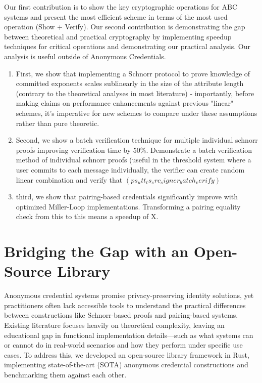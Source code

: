 Our first contribution is to show the key cryptographic operations for ABC systems and present the most efficient scheme in terms of the most used operation (Show + Verify). 
Our second contribution is demonstrating the gap between theoretical and practical cryptography by implementing speedup techniques for critical operations and demonstrating our practical analysis. Our analysis is useful outside of Anonymous Credentials.
\begin{enumerate}
    \item First, we show that implementing a Schnorr protocol to prove knowledge of committed exponents scales sublinearly in the size of the attribute length (contrary to the theoretical analyses in most literature) - importantly, before making claims on performance enhancements against previous "linear" schemes, it's imperative for new schemes to compare under these assumptions rather than pure theoretic. 

    \item Second, we show a batch verification technique for multiple individual schnorr proofs improving verification time by 50\%. Demonstrate a batch verification method of individual schnorr proofs (useful in the threshold system where a user commits to each message individually, the verifier can create random linear combination and verify that $(ps_utt_ts_src_signer_batch_verify)$

    \item third, we show that pairing-based credentials significantly improve with optimized Miller-Loop implementations. Transforming a pairing equality check from this to this means a speedup of X. 
\end{enumerate}



\section{Bridging the Gap with an Open-Source Library}

Anonymous credential systems promise privacy-preserving identity solutions, yet practitioners often lack accessible tools to understand the practical differences between constructions like Schnorr-based proofs and pairing-based systems. Existing literature focuses heavily on theoretical complexity, leaving an educational gap in functional implementation details—such as what systems can or cannot do in real-world scenarios and how they perform under specific use cases. To address this, we developed an open-source library framework in Rust, implementing state-of-the-art (SOTA) anonymous credential constructions and benchmarking them against each other.

